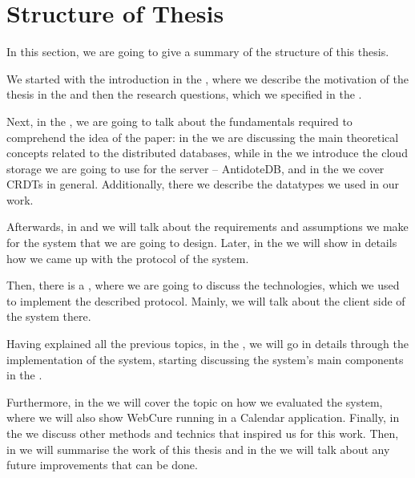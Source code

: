 \section{Structure of Thesis}

In this section, we are going to give a summary of the structure of this thesis. 

We started with the introduction in the , where we describe the motivation of the thesis in the  and then the research questions, which we specified in the . 

Next, in the , we are going to talk about the fundamentals required to comprehend the idea of the paper: in the  we are discussing the main theoretical concepts related to the distributed databases, while in the  we introduce the cloud storage we are going to use for the server -- AntidoteDB, and in the  we cover CRDTs in general. Additionally, there we describe the datatypes we used in our work. 

Afterwards, in  and  we will talk about the requirements and assumptions we make for the system that we are going to design. Later, in the  we will show in details how we came up with the protocol of the system. 

Then, there is a , where we are going to discuss the technologies, which we used to implement the described protocol. Mainly, we will talk about the client side of the system there.

Having explained all the previous topics, in the , we will go in details through the implementation of the system, starting discussing the system's main components in the .

Furthermore, in the  we will cover the topic on how we evaluated the system, where we will also show WebCure running in a Calendar application. Finally, in the  we discuss other methods and technics that inspired us for this work. Then, in  we will summarise the work of this thesis and in the  we will talk about any future improvements that can be done. 